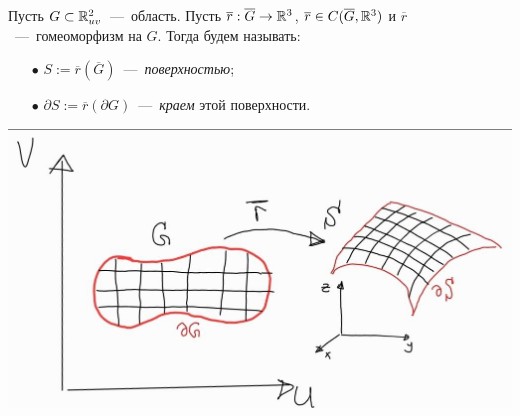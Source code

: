 \noindent 
\begin{minipage}{0.55\textwidth}
\begin{definition}
    Пусть $G \subset \mathbb{R}^2_{uv}$~---~область. Пусть $\overline{r}: \overline{G} \rightarrow \mathbb{R}^3$, $\overline{r} \in C(\overline{G}, \mathbb{R}^3)$ и $\overline{r}$~---~гомеоморфизм на $G$. Тогда будем называть:
    \begin{enumerate}
        \item[$\bullet$] $S := \overline{r}(\overline{G})$~---~\textit{поверхностью};
        \item[$\bullet$] $\partial  S := \overline{r}(\partial G)$~---~\textit{краем} этой поверхности.
    \end{enumerate}
\end{definition}
\end{minipage}
\begin{minipage}{0.45\textwidth}
\includegraphics[width=\textwidth]{images/poverhnost.png}
\end{minipage}




